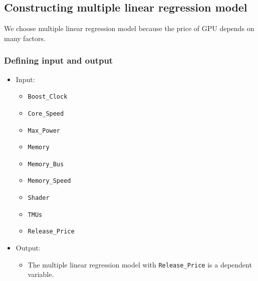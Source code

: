 \documentclass[a4paper]{article}
\begin{document}
\subsection{Constructing multiple linear regression model}
We choose multiple linear regression model because the price of GPU depends on many factors.
\subsubsection{Defining input and output}
\begin{itemize}
    \item Input: 
    \begin{itemize}
        \item \verb|Boost_Clock|
        \item \verb|Core_Speed|
        \item \verb|Max_Power|
        \item \verb|Memory|
        \item \verb|Memory_Bus|
        \item \verb|Memory_Speed|
        \item \verb|Shader|
        \item \verb|TMUs|
        \item \verb|Release_Price|
    \end{itemize}
    \item Output:
    \begin{itemize}
        \item The multiple linear regression model with \verb|Release_Price| is a dependent variable.
    \end{itemize}
\end{itemize}
\end{document}
